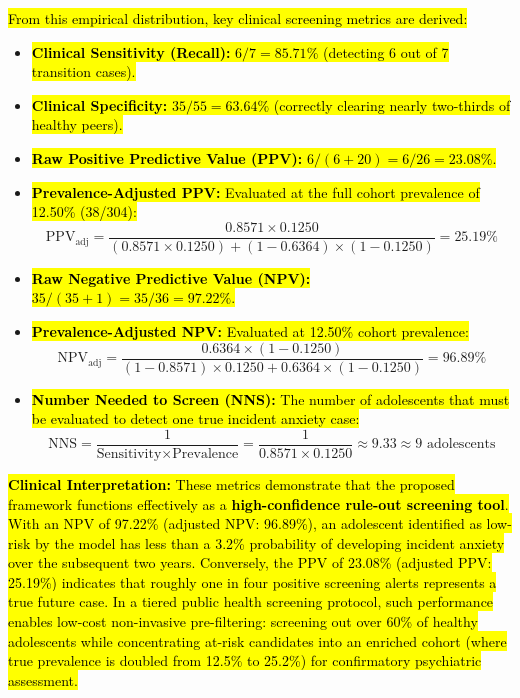 \documentclass[10pt,letterpaper]{article}
\begin{document}
\hl{From this empirical distribution, key clinical screening metrics are derived:}
\begin{itemize}
    \item \hl{\textbf{Clinical Sensitivity (Recall):} $6 / 7 = 85.71\%$ (detecting 6 out of 7 transition cases).}
    \item \hl{\textbf{Clinical Specificity:} $35 / 55 = 63.64\%$ (correctly clearing nearly two-thirds of healthy peers).}
    \item \hl{\textbf{Raw Positive Predictive Value (PPV):} $6 / (6 + 20) = 6 / 26 = 23.08\%$.}
    \item \hl{\textbf{Prevalence-Adjusted PPV:} Evaluated at the full cohort prevalence of 12.50\% (38/304):}
    \begin{equation} \label{eq:adj_ppv}
    \text{PPV}_{\text{adj}} = \frac{0.8571 \times 0.1250}{(0.8571 \times 0.1250) + (1 - 0.6364) \times (1 - 0.1250)} = 25.19\%
    \end{equation}
    \item \hl{\textbf{Raw Negative Predictive Value (NPV):} $35 / (35 + 1) = 35 / 36 = 97.22\%$.}
    \item \hl{\textbf{Prevalence-Adjusted NPV:} Evaluated at 12.50\% cohort prevalence:}
    \begin{equation} \label{eq:adj_npv}
    \text{NPV}_{\text{adj}} = \frac{0.6364 \times (1 - 0.1250)}{(1 - 0.8571) \times 0.1250 + 0.6364 \times (1 - 0.1250)} = 96.89\%
    \end{equation}
    \item \hl{\textbf{Number Needed to Screen (NNS):} The number of adolescents that must be evaluated to detect one true incident anxiety case:}
    \begin{equation} \label{eq:nns}
    \text{NNS} = \frac{1}{\text{Sensitivity} \times \text{Prevalence}} = \frac{1}{0.8571 \times 0.1250} \approx 9.33 \approx 9 \text{ adolescents}
    \end{equation}
\end{itemize}

\hl{\textbf{Clinical Interpretation:} These metrics demonstrate that the proposed framework functions effectively as a \textbf{high-confidence rule-out screening tool}. With an NPV of 97.22\% (adjusted NPV: 96.89\%), an adolescent identified as low-risk by the model has less than a 3.2\% probability of developing incident anxiety over the subsequent two years. Conversely, the PPV of 23.08\% (adjusted PPV: 25.19\%) indicates that roughly one in four positive screening alerts represents a true future case. In a tiered public health screening protocol, such performance enables low-cost non-invasive pre-filtering: screening out over 60\% of healthy adolescents while concentrating at-risk candidates into an enriched cohort (where true prevalence is doubled from 12.5\% to 25.2\%) for confirmatory psychiatric assessment.}
\end{document}
